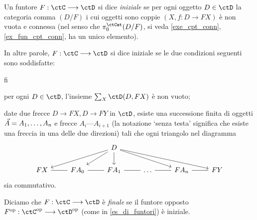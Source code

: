 \begin{definition}\label{def_fun_initfin}
	Un funtore \(F : \ctC\fun\ctD\) si dice \emph{iniziale} se per ogni oggetto \(D\in\ctD\) la categoria comma \((D/F)\) i cui oggetti sono coppie \((X,f : D\to FX)\) è non vuota e connessa (nel senso che \(\pi_0^\ctCat(D/F)\), si veda \ref{exe_cpt_conn}, \ref{ex_fun_cpt_conn}, ha un unico elemento).

	In altre parole, \(F : \ctC\fun\ctD\) si dice iniziale se le due condizioni seguenti sono soddisfatte:
	\begin{enumtag}{fi}
		\item \label{fi_1} per ogni \(D\in\ctD\), l'insieme \(\sum_X\Hom\ctD(D,FX)\) è non vuoto;
		\item \label{fi_2} date due frecce \(D\to FX, D\to FY\) in \(\ctD\), esiste una successione finita di oggetti \(\vec A = \tup An,\) e frecce \(A_i \text{---} A_{i+1}\) (la notazione `senza testa' significa che esiste una freccia in una delle due direzioni) tali che ogni triangolo nel diagramma
		\[\begin{tikzcd}
				&& D \\
				FX & {FA_0} & {FA_1} & \dots & {FA_n} & FY
				\arrow[from=1-3, to=2-1]
				\arrow[from=1-3, to=2-2]
				\arrow[from=1-3, to=2-3]
				\arrow[from=1-3, to=2-5]
				\arrow[from=1-3, to=2-6]
				\arrow[no head, from=2-1, to=2-2]
				\arrow[no head, from=2-2, to=2-3]
				\arrow[no head, from=2-3, to=2-4]
				\arrow[no head, from=2-4, to=2-5]
				\arrow[no head, from=2-5, to=2-6]
			\end{tikzcd}\]
		sia commutativo.
	\end{enumtag}
	Diciamo che \(F : \ctC\fun\ctD\) è \emph{finale} se il funtore opposto \(F^\op : \ctC^\op\fun\ctD^\op\) (come in \ref{es_di_funtori}) è iniziale.
\end{definition}
